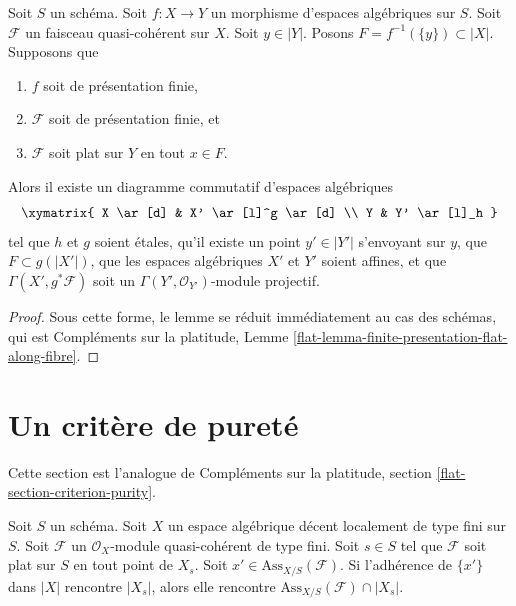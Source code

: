 \begin{lemma}
\label{lemma-finite-presentation-flat-along-fibre}
Soit $S$ un schéma.
Soit $f : X \to Y$ un morphisme d'espaces algébriques sur $S$.
Soit $\mathcal{F}$ un faisceau quasi-cohérent sur $X$.
Soit $y \in |Y|$. Posons $F = f^{-1}(\{y\}) \subset |X|$. Supposons que
\begin{enumerate}
\item $f$ soit de présentation finie,
\item $\mathcal{F}$ soit de présentation finie, et
\item $\mathcal{F}$ soit plat sur $Y$ en tout $x \in F$.
\end{enumerate}
Alors il existe un diagramme commutatif d'espaces algébriques
$$
\xymatrix{
X \ar[d] & X' \ar[l]^g \ar[d] \\
Y & Y' \ar[l]_h
}
$$
tel que $h$ et $g$ soient \'etales, qu'il existe un point
$y' \in |Y'|$ s'envoyant sur $y$, que $F \subset g(|X'|)$,
que les espaces algébriques $X'$ et $Y'$ soient affines, et que
$\Gamma(X', g^*\mathcal{F})$ soit un
$\Gamma(Y', \mathcal{O}_{Y'})$-module projectif.
\end{lemma}

\begin{proof}
Sous cette forme, le lemme se réduit immédiatement
au cas des schémas, qui est
Compléments sur la platitude, Lemme
\ref{flat-lemma-finite-presentation-flat-along-fibre}.
\end{proof}




\section{Un critère de pureté}
\label{section-criterion-purity}

\noindent
Cette section est l'analogue de Compléments sur la platitude, section
\ref{flat-section-criterion-purity}.

\begin{lemma}
\label{lemma-associated-point-specializes}
Soit $S$ un schéma. Soit $X$ un espace algébrique décent
localement de type fini sur $S$.
Soit $\mathcal{F}$ un $\mathcal{O}_X$-module quasi-cohérent de type fini.
Soit $s \in S$ tel que $\mathcal{F}$ soit plat sur $S$ en tout point de $X_s$.
Soit $x' \in \text{Ass}_{X/S}(\mathcal{F})$. Si
l'adhérence de $\{x'\}$ dans $|X|$ rencontre $|X_s|$, alors elle
rencontre $\text{Ass}_{X/S}(\mathcal{F}) \cap |X_s|$.
\end{lemma}

